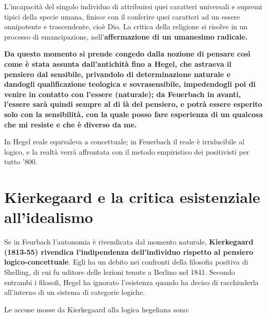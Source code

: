 L'incapacità del singolo individuo di attribuirsi quei caratteri universali e supremi tipici della specie umana, finisce con il conferire quei caratteri ad un essere onnipotente e trascendente, cioè Dio. La critica della religione si risolve in un processo di emancipazione, nell'\textbf{affermazione di un umanesimo radicale.}

\textbf{Da questo momento si prende congedo dalla nozione di pensare così come è stata assunta dall'antichità fino a Hegel, che astraeva il pensiero dal sensibile, privandolo di determinazione naturale e dandogli qualificazione teologica e sovrasensibile, impedendogli poi di venire in contatto con l'essere (naturale); da Feuerbach in avanti, l'essere sarà quindi sempre al di là del pensiero, e potrà essere esperito solo con la sensibilità, con la quale posso fare esperienza di un qualcosa che mi resiste e che è diverso da me.}

In Hegel reale equivaleva a concettuale; in Feuerbach il reale è irriducibile al logico, e la realtà verrà affrontata con il metodo empiristico dei positivisti per tutto '800.

\section{Kierkegaard e la critica esistenziale all'idealismo}

Se in Feurbach l'autonomia è rivendicata dal momento naturale, \textbf{Kierkegaard (1813-55) rivendica l'indipendenza dell'individuo rispetto al pensiero logico-concettuale}. Egli ha un debito nei confronti della filosofia positiva di Shelling, di cui fu uditore delle lezioni tenute a Berlino nel 1841. Secondo entrambi i filosofi, Hegel ha ignorato l'esistenza quando ha deciso di racchiuderla all'interno di un sistema di categorie logiche.

Le accuse mosse da Kierkegaard alla logica hegeliana sono:

